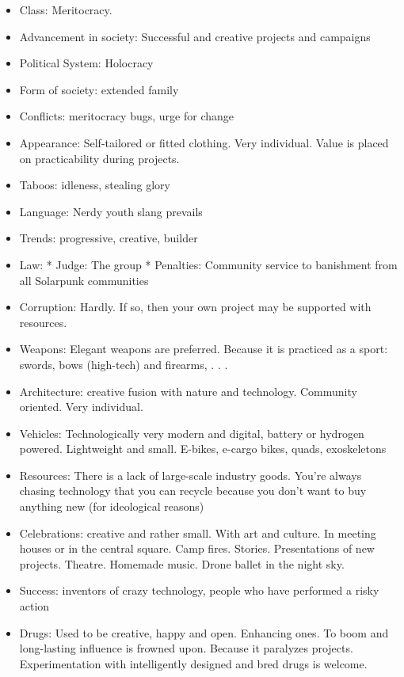 \begin{itemize}
    \item Class: Meritocracy.
    \item Advancement in society: Successful and creative projects and campaigns
    \item Political System: Holocracy
    \item Form of society: extended family
    \item Conflicts: meritocracy bugs, urge for change
    \item Appearance: Self-tailored or fitted clothing. Very individual. Value is placed on practicability during projects.
    \item Taboos: idleness, stealing glory
    \item Language: Nerdy youth slang prevails
    \item Trends: progressive, creative, builder
    \item Law: * Judge: The group * Penalties: Community service to banishment from all Solarpunk communities
    \item Corruption: Hardly. If so, then your own project may be supported with resources.
    \item Weapons: Elegant weapons are preferred. Because it is practiced as a sport: swords, bows (high-tech) and firearms, . . .
    \item Architecture: creative fusion with nature and technology. Community oriented. Very individual.
    \item Vehicles: Technologically very modern and digital, battery or hydrogen powered. Lightweight and small. E-bikes, e-cargo bikes, quads, exoskeletons
    \item Resources: There is a lack of large-scale industry goods. You're always chasing technology that you can recycle because you don't want to buy anything new (for ideological reasons)
    \item Celebrations: creative and rather small. With art and culture. In meeting houses or in the central square. Camp fires. Stories. Presentations of new projects. Theatre. Homemade music. Drone ballet in the night sky.
    \item Success: inventors of crazy technology, people who have performed a risky action
    \item Drugs: Used to be creative, happy and open. Enhancing ones. To boom and long-lasting influence is frowned upon. Because it paralyzes projects. Experimentation with intelligently designed and bred drugs is welcome.

\end{itemize}
